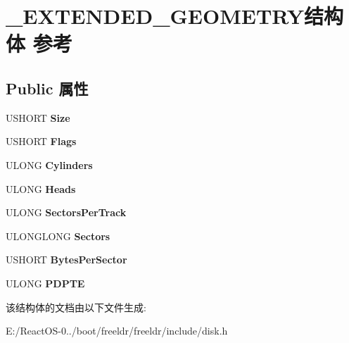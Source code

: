 \hypertarget{struct___e_x_t_e_n_d_e_d___g_e_o_m_e_t_r_y}{}\section{\+\_\+\+E\+X\+T\+E\+N\+D\+E\+D\+\_\+\+G\+E\+O\+M\+E\+T\+R\+Y结构体 参考}
\label{struct___e_x_t_e_n_d_e_d___g_e_o_m_e_t_r_y}
\subsection*{Public 属性}
\begin{DoxyCompactItemize}
\item 
\mbox{\label{struct___e_x_t_e_n_d_e_d___g_e_o_m_e_t_r_y_a6806dd0dcdde71c8f2ed461c3752f406}} 
U\+S\+H\+O\+RT {\bfseries Size}
\item 
\mbox{\label{struct___e_x_t_e_n_d_e_d___g_e_o_m_e_t_r_y_a77956d9a6ed7738a8acdef5d908f57c1}} 
U\+S\+H\+O\+RT {\bfseries Flags}
\item 
\mbox{\label{struct___e_x_t_e_n_d_e_d___g_e_o_m_e_t_r_y_ab6865e7ef6435b37ca3f345275a1d5b7}} 
U\+L\+O\+NG {\bfseries Cylinders}
\item 
\mbox{\label{struct___e_x_t_e_n_d_e_d___g_e_o_m_e_t_r_y_a9ba47bbd102c4522ed2c704b22059b62}} 
U\+L\+O\+NG {\bfseries Heads}
\item 
\mbox{\label{struct___e_x_t_e_n_d_e_d___g_e_o_m_e_t_r_y_a9d7a430a8ff2deee6e9cb0c2f8b92b06}} 
U\+L\+O\+NG {\bfseries Sectors\+Per\+Track}
\item 
\mbox{\label{struct___e_x_t_e_n_d_e_d___g_e_o_m_e_t_r_y_a543a6460b4b69f095a9678b8df108d5a}} 
U\+L\+O\+N\+G\+L\+O\+NG {\bfseries Sectors}
\item 
\mbox{\label{struct___e_x_t_e_n_d_e_d___g_e_o_m_e_t_r_y_a9bdbe10eda028c5592eeadb236673fa5}} 
U\+S\+H\+O\+RT {\bfseries Bytes\+Per\+Sector}
\item 
\mbox{\label{struct___e_x_t_e_n_d_e_d___g_e_o_m_e_t_r_y_ac3920705bc8eeb2e9ae83af7d03ae9bf}} 
U\+L\+O\+NG {\bfseries P\+D\+P\+TE}
\end{DoxyCompactItemize}


该结构体的文档由以下文件生成\+:\begin{DoxyCompactItemize}
\item 
E\+:/\+React\+O\+S-\/0../boot/freeldr/freeldr/include/disk.\+h\end{DoxyCompactItemize}
